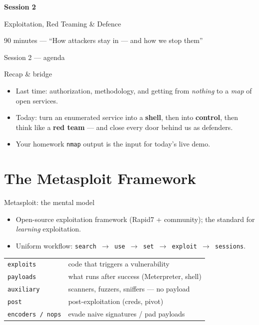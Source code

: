 \documentclass[aspectratio=169,11pt]{beamer}
\newcommand{\sessionbanner}[3]{%
  \begin{frame}[standout]
    {\Large\textbf{Session #1}}\par\vspace{0.6em}
    {#2}\par\vspace{0.8em}
    {\small\color{kaliBlue}#3}
  \end{frame}}
\begin{document}
\sessionbanner{2}{Exploitation, Red Teaming \& Defence}{90 minutes --- ``How attackers stay in --- and how we stop them''}

\begin{frame}{Session 2 --- agenda}\tableofcontents[sections={7-12}]\end{frame}

\begin{frame}{Recap \& bridge}
  \begin{itemize}
    \item Last time: authorization, methodology, and getting from \emph{nothing}
          to a \emph{map} of open services.
    \item Today: turn an enumerated service into a \textbf{shell}, then into
          \textbf{control}, then think like a \textbf{red team} --- and close
          every door behind us as defenders.
    \item Your homework \texttt{nmap} output is the input for today's live demo.
  \end{itemize}
\end{frame}

\section{The Metasploit Framework}
\begin{frame}{Metasploit: the mental model}
  \begin{itemize}
    \item Open-source exploitation framework (Rapid7 + community); the standard
          for \emph{learning} exploitation.
    \item Uniform workflow: \texttt{search $\to$ use $\to$ set $\to$ exploit
          $\to$ sessions}.
  \end{itemize}
  \begin{table}\footnotesize
  \begin{tabular}{@{}ll@{}}\toprule
  \texttt{exploits}  & code that triggers a vulnerability \\
  \texttt{payloads}  & what runs after success (Meterpreter, shell) \\
  \texttt{auxiliary} & scanners, fuzzers, sniffers --- no payload \\
  \texttt{post}      & post-exploitation (creds, pivot) \\
  \texttt{encoders / nops} & evade naive signatures / pad payloads \\
  \bottomrule\end{tabular}\end{table}
\end{frame}
\end{document}
